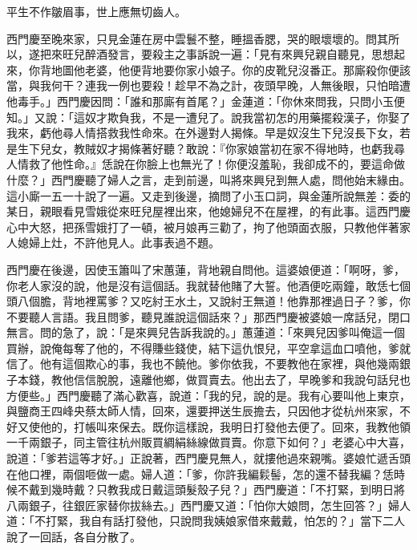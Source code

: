 \begin{showcontents}{}
平生不作皺眉事，世上應無切齒人。

西門慶至晚來家，只見金蓮在房中雲鬟不整，睡搵香腮，哭的眼壞壞的。問其所以，遂把來旺兒醉酒發言，要殺主之事訴說一遍：「見有來興兒親自聽見，思想起來，你背地圖他老婆，他便背地要你家小娘子。你的皮靴兒沒番正。那廝殺你便該當，與我何干？連我一例也要殺！趁早不為之計，夜頭早晚，人無後眼，只怕暗遭他毒手。」西門慶因問：「誰和那廝有首尾？」金蓮道：「你休來問我，只問小玉便知。」又說：「這奴才欺負我，不是一遭兒了。說我當初怎的用藥擺殺漢子，你娶了我來，虧他尋人情搭救我性命來。在外邊對人揭條。早是奴沒生下兒沒長下女，若是生下兒女，教賊奴才揭條著好聽？敢說：『你家娘當初在家不得地時，也虧我尋人情救了他性命。』恁說在你臉上也無光了！你便沒羞恥，我卻成不的，要這命做什麼？」西門慶聽了婦人之言，走到前邊，叫將來興兒到無人處，問他始末緣由。這小廝一五一十說了一遍。又走到後邊，摘問了小玉口詞，與金蓮所說無差：委的某日，親眼看見雪娥從來旺兒屋裡出來，他媳婦兒不在屋裡，的有此事。這西門慶心中大怒，把孫雪娥打了一頓，被月娘再三勸了，拘了他頭面衣服，只教他伴著家人媳婦上灶，不許他見人。此事表過不題。

西門慶在後邊，因使玉簫叫了宋蕙蓮，背地親自問他。這婆娘便道：「啊呀，爹，你老人家沒的說，他是沒有這個話。我就替他賭了大誓。他酒便吃兩鐘，敢恁七個頭八個膽，背地裡罵爹？又吃紂王水土，又說紂王無道！他靠那裡過日子？爹，你不要聽人言語。我且問爹，聽見誰說這個話來？」那西門慶被婆娘一席話兒，閉口無言。問的急了，說：「是來興兒告訴我說的。」蕙蓮道：「來興兒因爹叫俺這一個買辦，說俺每奪了他的，不得賺些錢使，結下這仇恨兒，平空拿這血口噴他，爹就信了。他有這個欺心的事，我也不饒他。爹你依我，不要教他在家裡，與他幾兩銀子本錢，教他信信脫脫，遠離他鄉，做買賣去。他出去了，早晚爹和我說句話兒也方便些。」西門慶聽了滿心歡喜，說道：「我的兒，說的是。我有心要叫他上東京，與鹽商王四峰央蔡太師人情，回來，還要押送生辰擔去，只因他才從杭州來家，不好又使他的，打帳叫來保去。既你這樣說，我明日打發他去便了。回來，我教他領一千兩銀子，同主管往杭州販買綢絹絲線做買賣。你意下如何？」老婆心中大喜，說道：「爹若這等才好。」正說著，西門慶見無人，就摟他過來親嘴。婆娘忙遞舌頭在他口裡，兩個咂做一處。婦人道：「爹，你許我編鬏髻，怎的還不替我編？恁時候不戴到幾時戴？只教我成日戴這頭髮殼子兒？」西門慶道：「不打緊，到明日將八兩銀子，往銀匠家替你拔絲去。」西門慶又道：「怕你大娘問，怎生回答？」婦人道：「不打緊，我自有話打發他，只說問我姨娘家借來戴戴，怕怎的？」當下二人說了一回話，各自分散了。


\end{showcontents}
